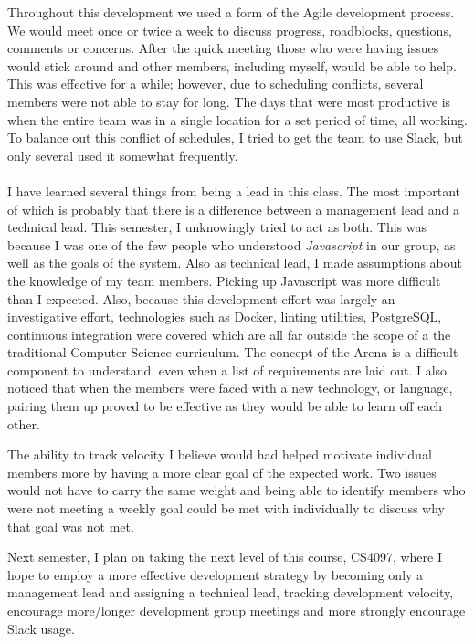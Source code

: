 \documentclass{article}
\begin{document}
Throughout this development we used a form of the Agile development process. We would meet once or twice a week to discuss progress, roadblocks, questions, comments or concerns. After the quick meeting those who were having issues would stick around and other members, including myself, would be able to help. This was effective for a while; however, due to scheduling conflicts, several members were not able to stay for long. The days that were most productive is when the entire team was in a single location for a set period of time, all working. To balance out this conflict of schedules, I tried to get the team to use Slack, but only several used it somewhat frequently.

\paragraph{}
I have learned several things from being a lead in this class. The most important of which is probably that there is a difference between a management lead and a technical lead. This semester, I unknowingly tried to act as both. This was because I was one of the few people who understood \textit{Javascript} in our group, as well as the goals of the system. Also as technical lead, I made assumptions about the knowledge of my team members. Picking up Javascript was more difficult than I expected. Also, because this development effort was largely an investigative effort, technologies such as Docker, linting utilities, PostgreSQL, continuous integration were covered which are all far outside the scope of a the traditional Computer Science curriculum. The concept of the Arena is a difficult component to understand, even when a list of requirements are laid out. I also noticed that when the members were faced with a new technology, or language, pairing them up proved to be effective as they would be able to learn off each other. 

The ability to track velocity I believe would had helped motivate individual members more by having a more clear goal of the expected work. Two issues would not have to carry the same weight and being able to identify members who were not meeting a weekly goal could be met with individually to discuss why that goal was not met. 

Next semester, I plan on taking the next level of this course, CS4097, where I hope to employ a more effective development strategy by becoming only a management lead and assigning a technical lead, tracking development velocity, encourage more/longer development group meetings and more strongly encourage Slack usage. 
\end{document}
